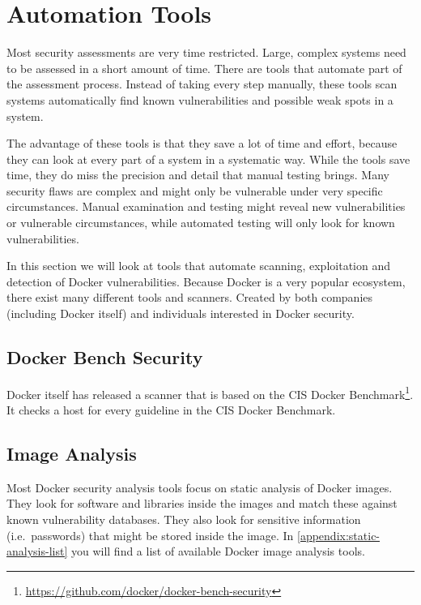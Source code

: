 \section{Automation Tools}\label{section:tools}
Most security assessments are very time restricted. Large, complex systems need to be assessed in a short amount of time. There are tools that automate part of the assessment process. Instead of taking every step manually, these tools scan systems automatically find known vulnerabilities and possible weak spots in a system.

The advantage of these tools is that they save a lot of time and effort, because they can look at every part of a system in a systematic way. While the tools save time, they do miss the precision and detail that manual testing brings. Many security flaws are complex and might only be vulnerable under very specific circumstances. Manual examination and testing might reveal new vulnerabilities or vulnerable circumstances, while automated testing will only look for known vulnerabilities.

\hfill

In this section we will look at tools that automate scanning, exploitation and detection of Docker vulnerabilities. Because Docker is a very popular ecosystem, there exist many different tools and scanners. Created by both companies (including Docker itself) and individuals interested in Docker security.

\subsection{Docker Bench Security}
Docker itself has released a scanner that is based on the CIS Docker Benchmark\footnote{\url{https://github.com/docker/docker-bench-security}}. It checks a host for every guideline in the CIS Docker Benchmark.

\subsection{Image Analysis}\label{subsection:image-analysis-tools}
Most Docker security analysis tools focus on static analysis of Docker images. They look for software and libraries inside the images and match these against known vulnerability databases. They also look for sensitive information (i.e.\ passwords) that might be stored inside the image. In \autoref{appendix:static-analysis-list} you will find a list of available Docker image analysis tools.

